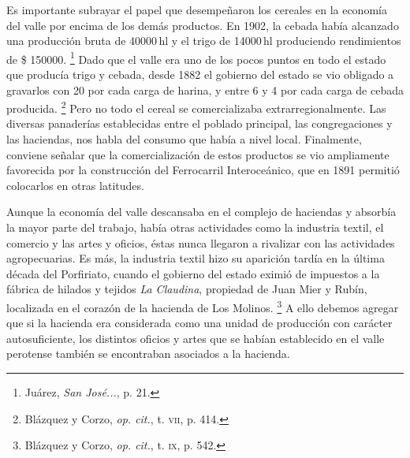 \documentclass[14pt,twoside,final]{extbook} %
\let\oldfootnote\footnote
\renewcommand\footnote[1]{%
\oldfootnote{\hspace{1mm}#1}}
\begin{document}
Es importante subrayar el papel que desempeñaron los cereales en la economía del valle por encima de los demás productos. En 1902, la cebada había alcanzado una producción bruta de 40000\,hl y el trigo de 14000\,hl produciendo rendimientos de \$ 150000.\footnote{Juárez, \emph{San José...}, p. 21.} Dado que el valle era uno de los pocos puntos en todo el estado que producía trigo y cebada, desde 1882 el gobierno del estado se vio obligado a gravarlos con \textcent{} 20 por cada carga de harina, y entre \textcent{} 6 y \textcent{} 4 por cada carga de cebada producida.\footnote{Blázquez y Corzo, \emph{op. cit.}, t. \textsc{vii}, p. 414.} Pero no todo el cereal se comercializaba extrarregionalmente. Las diversas panaderías establecidas entre el poblado principal, las congregaciones y las haciendas, nos habla del consumo que había a nivel local. Finalmente, conviene señalar que la comercialización de estos productos se vio ampliamente favorecida por la construcción del Ferrocarril Interoceánico, que en 1891 permitió colocarlos en otras latitudes.

Aunque la economía del valle descansaba en el complejo de haciendas y absorbía la mayor parte del trabajo, había otras actividades como la industria textil, el comercio y las artes y oficios, éstas nunca llegaron a rivalizar con las actividades agropecuarias. Es más, la industria textil hizo su aparición tardía en la última década del Porfiriato, cuando el gobierno del estado eximió de impuestos a la fábrica de hilados y tejidos \emph{La Claudina}, propiedad de Juan Mier y Rubín, localizada en el corazón de la hacienda de Los Molinos.\footnote{Blázquez y Corzo, \emph{op. cit.}, t. \textsc{ix}, p. 542.} A ello debemos agregar que si la hacienda era considerada como una unidad de producción con carácter autosuficiente, los distintos oficios y artes que se habían establecido en el valle perotense también se encontraban asociados a la hacienda.
\end{document}
